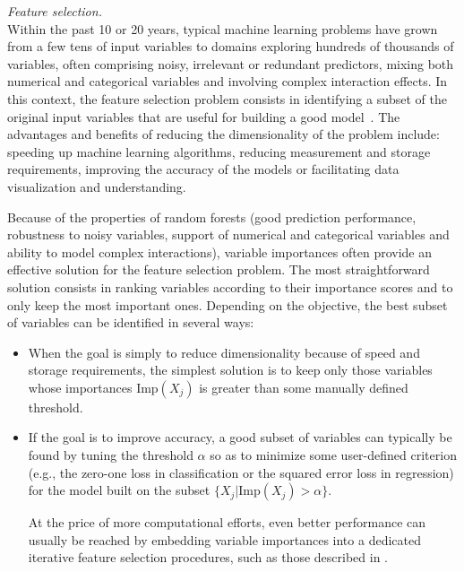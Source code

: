 \begin{description}

\item \textit{Feature selection.} \hfill \\
    Within the past 10 or 20 years, typical machine learning problems have
    grown from a few tens of input variables to domains exploring hundreds of
    thousands of variables, often comprising noisy, irrelevant or redundant
    predictors, mixing both numerical and categorical variables and involving
    complex interaction effects. In this context, the feature selection problem
    consists in identifying a subset of the original input variables that are
    useful for building a good model~\citep{guyon:2003,liu:2005}. The
    advantages and benefits of reducing the dimensionality of the problem
    include: speeding up machine learning algorithms, reducing measurement and
    storage requirements, improving the accuracy of the models or facilitating
    data visualization and understanding.

    Because of the properties of random forests (good prediction performance,
    robustness to noisy variables, support of numerical and categorical
    variables and ability to model complex interactions), variable importances
    often provide an effective solution for the feature selection problem. The
    most straightforward solution consists in ranking variables according to
    their importance scores and to only keep the most important ones. Depending
    on the objective, the best subset of variables can be identified in
    several ways:

    \begin{itemize}
    \item  When the goal is simply to reduce dimensionality because of speed
           and storage requirements, the simplest solution
           is to keep only those variables whose importances $\text{Imp}(X_j)$
           is greater than some manually defined threshold.

    \item If the goal is to improve accuracy, a good subset
          of variables can typically be found by tuning the threshold $\alpha$ so as to
          minimize some user-defined criterion (e.g., the zero-one loss in classification
          or the squared error loss in regression) for the model built on the
          subset $\{X_j | \text{Imp}(X_j) > \alpha \}$.

          At the price of more computational efforts, even better performance
          can usually be reached by embedding variable importances into a
          dedicated iterative feature selection procedures, such as those
          described in \citep{guyon:2002,tuv:2009}.


\end{itemize}
\end{description}
